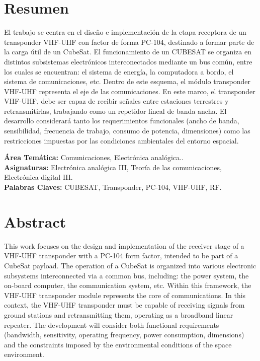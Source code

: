 \documentclass[11pt,a4paper,twoside]{report}
\begin{document}
	\chapter*{Resumen}
	El trabajo se centra en el diseño e implementación de la etapa receptora de un transponder VHF-UHF con factor de forma PC-104, destinado a formar parte de la carga útil de un CubeSat. El funcionamiento de un CUBESAT se organiza en distintos subsistemas electrónicos interconectados mediante un bus  común, entre los cuales se encuentran: el sistema de energía, la computadora a bordo, el sistema de comunicaciones, etc. Dentro de este esquema, el módulo transponder VHF-UHF  representa el eje de las comunicaciones. En este marco, el transponder VHF-UHF, debe ser capaz de recibir señales entre estaciones terrestres y retransmitirlas, trabajando como un repetidor lineal de banda ancha. El desarrollo considerará tanto los requerimientos funcionales (ancho de banda, sensibilidad, frecuencia de trabajo, consumo de potencia, dimensiones) como las restricciones impuestas por las condiciones ambientales del entorno espacial.
	
	\vspace{1cm}
	\noindent \textbf{Área Temática:} Comunicaciones, Electrónica analógica.. \\
	\textbf{Asignaturas:} Electrónica analógica III, Teoría de las comunicaciones, Electrónica digital III. \\
	\textbf{Palabras Claves:} CUBESAT, Transponder, PC-104, VHF-UHF, RF.
	\clearpage
	
	\chapter*{Abstract}
	This work focuses on the design and implementation of the receiver stage of a VHF-UHF transponder with a PC-104 form factor, intended to be part of a CubeSat payload. The operation of a CubeSat is organized into various electronic subsystems interconnected via a common bus, including: the power system, the on-board computer, the communication system, etc. Within this framework, the VHF-UHF transponder module represents the core of communications. In this context, the VHF-UHF transponder must be capable of receiving signals from ground stations and retransmitting them, operating as a broadband linear repeater. The development will consider both functional requirements (bandwidth, sensitivity, operating frequency, power consumption, dimensions) and the constraints imposed by the environmental conditions of the space environment.
	
\end{document}
